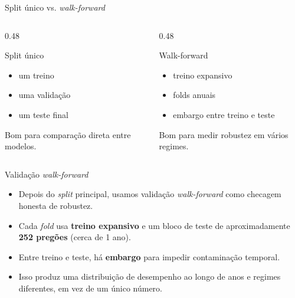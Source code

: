 \documentclass{libs/ufc_format}
\begin{document}
\begin{frame}{Split único vs. \emph{walk-forward}}
    \begin{columns}
        \begin{column}{0.48\textwidth}
            \begin{block}{Split único}
                \begin{itemize}
                    \item um treino
                    \item uma validação
                    \item um teste final
                \end{itemize}
            \end{block}

            \vspace{0.2cm}
            \small Bom para comparação direta entre modelos.
        \end{column}
        \begin{column}{0.48\textwidth}
            \begin{exampleblock}{Walk-forward}
                \begin{itemize}
                    \item treino expansivo
                    \item folds anuais
                    \item embargo entre treino e teste
                \end{itemize}
            \end{exampleblock}

            \vspace{0.2cm}
            \small Bom para medir robustez em vários regimes.
        \end{column}
    \end{columns}

    \vspace{0.4cm}
\end{frame}

\begin{frame}{Validação \emph{walk-forward}}
    \begin{itemize}
        \item Depois do \emph{split} principal, usamos validação \emph{walk-forward} como checagem honesta de robustez.
        \item Cada \emph{fold} usa \textbf{treino expansivo} e um bloco de teste de aproximadamente \textbf{252 pregões} (cerca de 1 ano).
        \item Entre treino e teste, há \textbf{embargo} para impedir contaminação temporal.
        \item Isso produz uma distribuição de desempenho ao longo de anos e regimes diferentes, em vez de um único número.
    \end{itemize}
\end{frame}
\end{document}
